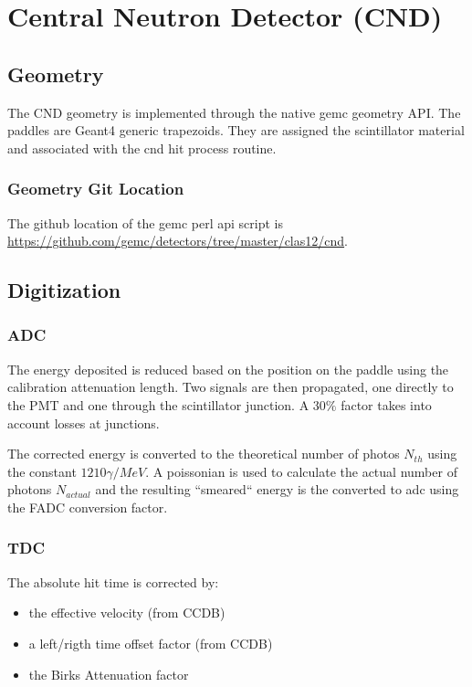 \section{Central Neutron Detector (CND)}

\subsection{Geometry}

The CND geometry is implemented through the native gemc geometry API.
The paddles are Geant4 generic trapezoids. They are assigned the scintillator material and associated with the cnd hit process routine.

\subsubsection{Geometry Git Location}
The github location of the gemc perl api script is \url{https://github.com/gemc/detectors/tree/master/clas12/cnd}.


\subsection{Digitization}

\subsubsection{ADC}

The energy deposited is reduced based on the position on the paddle using the calibration attenuation length. Two signals are then propagated, one directly
to the PMT and one through the scintillator junction. A $30\%$ factor takes into account losses at junctions.

The corrected energy is converted to the theoretical number of photos $N_{th}$ using the constant $1210 \gamma / MeV $. A poissonian is used to
calculate the actual number of photons $N_{actual}$ and the resulting ``smeared`` energy is the converted to adc using the FADC conversion factor.

\subsubsection{TDC}

The absolute hit time is corrected by:

\begin{itemize}
	\item the effective velocity (from CCDB)
	\item a left/rigth time offset factor (from CCDB)
	\item the Birks Attenuation factor
\end{itemize}

